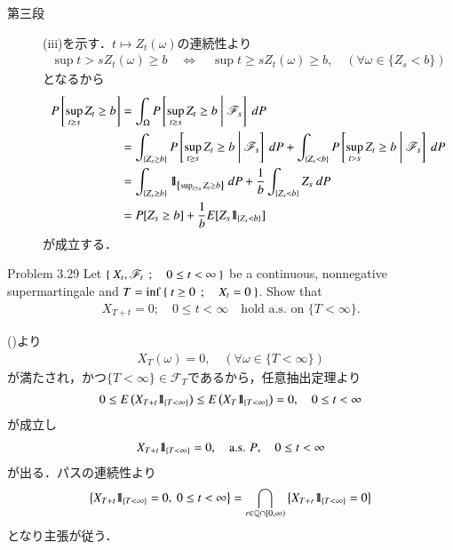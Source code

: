\begin{prf}
\begin{description}
			\item[第三段]
				(iii)を示す．$t \longmapsto Z_t(\omega)$の連続性より
				\begin{align}
					\sup{t > s}{Z_t(\omega)} \geq b 
					\quad \Leftrightarrow \quad
					\sup{t \geq s}{Z_t(\omega)} \geq b,
					\quad (\forall \omega \in \{Z_s < b\})
				\end{align}
				となるから
				\begin{align}
					P\left[ \operatorname*{sup}_{t \geq s} Z_t \geq b \right]
					&= \int_\Omega P\left[ \operatorname*{sup}_{t \geq s} Z_t \geq b\ \middle|\ \mathscr{F}_s \right]\ dP \\
					&= \int_{\{Z_s \geq b\}} P\left[ \operatorname*{sup}_{t \geq s} Z_t \geq b\ \middle|\ \mathscr{F}_s \right]\ dP
						+ \int_{\{Z_s < b\}} P\left[ \operatorname*{sup}_{t > s} Z_t \geq b\ \middle|\ \mathscr{F}_s \right]\ dP \\
					&= \int_{\{Z_s \geq b\}} \mbox{1}\hspace{-0.25em}\mbox{l}_{\left\{ \operatorname*{sup}_{t \geq s} Z_t \geq b \right\}}\ dP
						+ \frac{1}{b} \int_{\{Z_s < b\}} Z_s\ dP \\
					&= P[Z_s \geq b] + \frac{1}{b} E[Z_s \mbox{1}\hspace{-0.25em}\mbox{l}_{\{Z_s < b\}}]
				\end{align}
				が成立する．
				\QED
		\end{description}
	\end{prf}
	
	\begin{itembox}[l]{Problem 3.29}
		Let $\left\{\ X_t,\mathscr{F}_t\ \, ; \quad 0 \leq t < \infty\ \right\}$ be a continuous, nonnegative supermartingale
		and $T = \operatorname*{inf}_{} \left\{\ t \geq 0\ \, ; \quad X_t = 0\ \right\}$. Show that
		\begin{align}
			X_{T + t} = 0; \quad 0 \leq t < \infty \quad \mbox{hold a.s. on $\{T < \infty\}$}.
		\end{align}
	\end{itembox}
	
	\begin{prf}
		()より
		\begin{align}
			X_T(\omega) = 0,
			\quad (\forall \omega \in \{T < \infty\})
		\end{align}
		が満たされ，かつ$\{T < \infty\} \in \mathscr{F}_T$であるから，任意抽出定理より
		\begin{align}
			0 \leq E\left( X_{T+t} \mbox{1}\hspace{-0.25em}\mbox{l}_{\{T < \infty\}} \right) \leq E\left( X_T \mbox{1}\hspace{-0.25em}\mbox{l}_{\{T < \infty\}} \right) = 0,
			\quad 0 \leq t < \infty
		\end{align}
		が成立し
		\begin{align}
			X_{T+t} \mbox{1}\hspace{-0.25em}\mbox{l}_{\{T < \infty\}} = 0,
			\quad \mbox{a.s. $P$},
			\quad 0 \leq t < \infty
		\end{align}
		が出る．パスの連続性より
		\begin{align}
			\left\{ X_{T+t} \mbox{1}\hspace{-0.25em}\mbox{l}_{\{T < \infty\}} = 0,\ 0 \leq t < \infty \right\}
			= \bigcap_{r \in \mathbb{Q} \cap [0,\infty)} \left\{ X_{T+r} \mbox{1}\hspace{-0.25em}\mbox{l}_{\{T < \infty\}} = 0 \right\}
		\end{align}
		となり主張が従う．
		\QED
	\end{prf}
	
